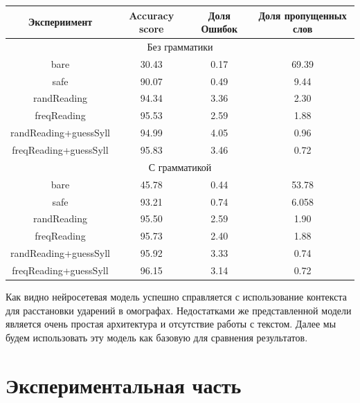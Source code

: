 \documentclass[14pt, a4paper, russian]{report}
\begin{document}
\begin{normalsize}
\begin{table}[H]
	\begin{small}
		\begin{center}
			\begin{tabular}{|c|c|c|c|}
				\hline
				Экспериимент & Accuracy score & Доля Ошибок & Доля пропущенных слов\\
				\hline
				\multicolumn{4}{|c|}{Без грамматики} \\			
				\hline
				bare & 30.43 & 0.17 & 69.39 \\
				\hline
				safe & 90.07 & 0.49 & 9.44 \\
				\hline
				randReading &94.34 &3.36 &2.30 \\
				\hline
				freqReading &95.53 &2.59& 1.88 \\
				\hline
				randReading+guessSyll &94.99 &4.05 &0.96 \\
				\hline
				freqReading+guessSyll & 95.83 &3.46 &0.72\\
				\hline
				\multicolumn{4}{|c|}{С грамматикой} \\			
				\hline
				bare &45.78 & 0.44 &53.78\\
				\hline
				safe &93.21& 0.74 &6.058 \\
				\hline
				randReading &95.50 &2.59 &1.90 \\
				\hline
				freqReading &95.73 &2.40 &1.88 \\
				\hline
				randReading+guessSyll &95.92 &3.33 &0.74 \\
				\hline
				freqReading+guessSyll &96.15 &3.14 &0.72 \\
				\hline
				
			\end{tabular}
		\end{center}
	\end{small}
	\label{table:base_homo}
\end{table}

Как видно нейросетевая модель успешно справляется с использование контекста для расстановки ударений в омографах. Недостатками же представленной модели является очень простая архитектура и отсутствие работы с текстом. Далее мы будем использовать эту модель как базовую для сравнения результатов. 


\newpage
\chapter{Экспериментальная часть}

\end{normalsize}
\end{document}
